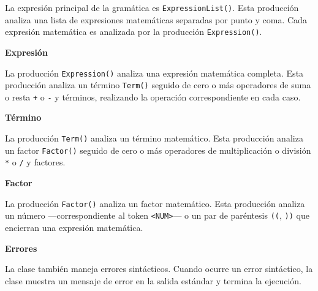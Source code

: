 \lstset{inputencoding=utf8/latin1}


\noindent La expresión principal de la gramática es \lstinline|ExpressionList()|. Esta producción analiza una lista de expresiones matemáticas separadas por punto y coma. Cada expresión matemática es analizada por la producción \lstinline|Expression()|.

\phantom{text}

\noindent \textbf{Expresión}

\phantom{text}

\lstset{inputencoding=utf8/latin1}


\noindent La producción \lstinline|Expression()| analiza una expresión matemática completa. Esta producción analiza un término \lstinline|Term()| seguido de cero o más operadores de suma o resta \lstinline|+| o \lstinline|-| y términos, realizando la operación correspondiente en cada caso.

\phantom{text}

\noindent \textbf{Término}

\phantom{text}

\lstset{inputencoding=utf8/latin1}


\noindent La producción \lstinline|Term()| analiza un término matemático. Esta producción analiza un factor \lstinline|Factor()| seguido de cero o más operadores de multiplicación o división \lstinline|*| o \lstinline|/| y factores.

\phantom{text}

\noindent \textbf{Factor}

\phantom{text}

\lstset{inputencoding=utf8/latin1}


\noindent La producción \lstinline|Factor()| analiza un factor matemático. Esta producción analiza un número ---correspondiente al token  \lstinline|<NUM>|--- o un par de paréntesis \lstinline|((|, \lstinline|))| que encierran una expresión matemática.

\phantom{text}

\noindent \textbf{Errores}

\phantom{text}

\noindent La clase también maneja errores sintácticos. Cuando ocurre un error sintáctico, la clase muestra un mensaje de error en la salida estándar y termina la ejecución.

\phantom{text}

